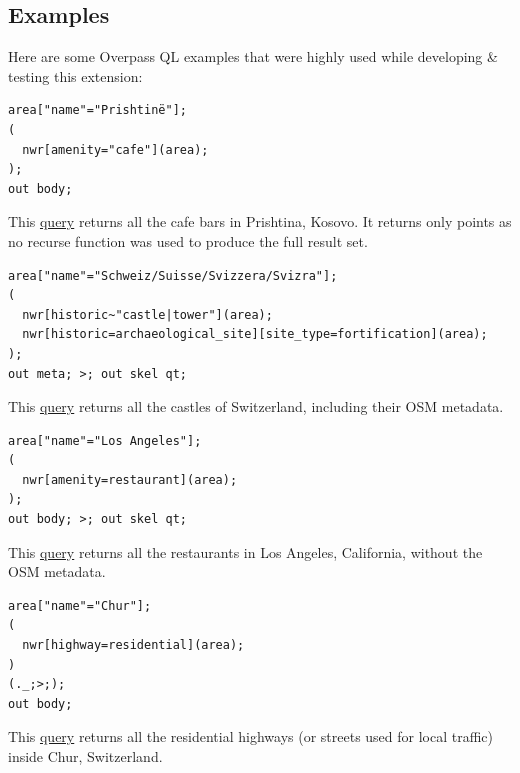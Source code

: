 \subsection{Examples}
Here are some Overpass QL examples that were highly used while developing \& testing this extension:
\begin{verbatim}
area["name"="Prishtinë"];
(
  nwr[amenity="cafe"](area);
);
out body;
\end{verbatim}
This \href{https://overpass-turbo.eu/s/1aTT}{query} returns all the cafe bars in Prishtina, Kosovo.
It returns only points as no recurse function was used to produce the full result set.
\begin{verbatim}
area["name"="Schweiz/Suisse/Svizzera/Svizra"];
(
  nwr[historic~"castle|tower"](area);
  nwr[historic=archaeological_site][site_type=fortification](area);
);
out meta; >; out skel qt;
\end{verbatim}
This \href{https://overpass-turbo.eu/s/1aTT}{query} returns all the castles of Switzerland, including their OSM metadata.
\begin{verbatim}
area["name"="Los Angeles"];
(
  nwr[amenity=restaurant](area);
);
out body; >; out skel qt;
\end{verbatim}
This \href{https://overpass-turbo.eu/s/1aTR}{query} returns all the restaurants in Los Angeles, California, without the OSM metadata.
\begin{verbatim}
area["name"="Chur"];
(
  nwr[highway=residential](area);
)
(._;>;);
out body;
\end{verbatim}
This \href{https://overpass-turbo.eu/s/1aTV}{query} returns all the residential highways (or streets used for local traffic) inside Chur, Switzerland.